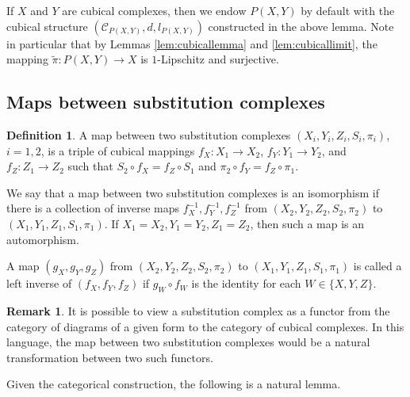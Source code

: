 \documentclass{amsart}
\theoremstyle{plain}
\theoremstyle{definition}
\newtheorem{definition}[theorem]{Definition}
\newtheorem{remark}[theorem]{Remark}
\numberwithin{equation}{section}
\numberwithin{theorem}{section}
\newcommand{\cC}{\mathcal{C}}
\begin{document}
If $X$ and $Y$ are cubical complexes, then we endow $P(X,Y)$ by default with the cubical structure $(\cC_{P(X,Y)}, d, l_{P(X,Y)})$ constructed in the above lemma. Note in particular that by Lemmas \ref{lem:cubicallemma} and \ref{lem:cubicallimit}, the mapping $\tilde{\pi}\colon P(X,Y)\rightarrow X$ is $1$-Lipschitz and surjective.


\subsection{Maps between substitution complexes}

\begin{definition}\label{def:morphism}
    A map between two substitution complexes $(X_i,Y_i,Z_i,S_i,\pi_i)$, $i=1,2$, is a triple of cubical mappings $f_{X}:X_1\to X_2$, $f_{Y}:Y_1\to Y_2$, and $f_Z:Z_1\to Z_2$ such that
    $S_2 \circ f_X = f_Z\circ S_1$ and $\pi_2\circ f_Y = f_Z \circ \pi_1$.

    We say that a map between two substitution complexes is an isomorphism if there is a collection of inverse maps $f_X^{-1}, f_Y^{-1}, f_Z^{-1}$ from $(X_2,Y_2,Z_2,S_2,\pi_2)$ to $(X_1,Y_1,Z_1,S_1,\pi_1)$. If $X_1=X_2, Y_1=Y_2, Z_1=Z_2$, then such a map is an automorphism.

    A map $(g_X,g_Y,g_Z)$ from $(X_2,Y_2,Z_2,S_2,\pi_2)$ to $(X_1,Y_1,Z_1,S_1,\pi_1)$  is called a left inverse of $(f_X,f_Y,f_Z)$ if $g_W \circ f_W$ is the identity for each $W\in\{X,Y,Z\}$.
\end{definition}
\begin{remark}
    It is possible to view a substitution complex as a  functor from the category of diagrams of a given form to the category of cubical complexes. In this language, the map between two substitution complexes would be a natural transformation between two such functors. 
\end{remark}

Given the categorical construction, the following is a natural lemma.
\end{document}
